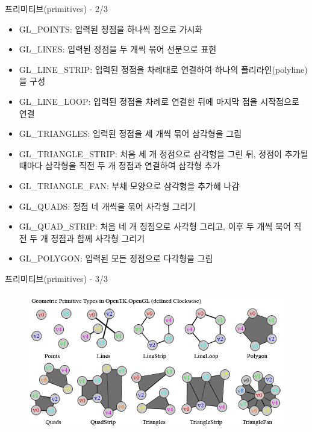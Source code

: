 \documentclass{beamer}
\begin{document}
\begin{frame}[fragile]{프리미티브(primitives) - 2/3}

{\small
\begin{itemize}
\item {\sf GL\_POINTS}: 입력된 정점을 하나씩 점으로 가시화
\item {\sf GL\_LINES}: 입력된 정점을 두 개씩 묶어 선분으로 표현 
\item {\sf GL\_LINE\_STRIP}: 입력된 정점을 차례대로 연결하여 하나의 폴리라인(polyline)을 구성
\item {\sf GL\_LINE\_LOOP}: 입력된 정점을 차례로 연결한 뒤에 마지막 점을 시작점으로 연결
\item {\sf GL\_TRIANGLES}: 입력된 정점을 세 개씩 묶어 삼각형을 그림
\item {\sf GL\_TRIANGLE\_STRIP}: 처음 세 개 정점으로 삼각형을 그린 뒤, 정점이 추가될 때마다 삼각형을 직전 두 개 정점과 연결하여 삼각형 추가 
\item {\sf GL\_TRIANGLE\_FAN}: 부채 모양으로 삼각형을 추가해 나감
\item {\sf GL\_QUADS}: 정점 네 개씩을 묶어 사각형 그리기
\item {\sf GL\_QUAD\_STRIP}: 처음 네 개 정점으로 사각형 그리고, 이후 두 개씩 묵어 직전 두 개 정점과 함께 사각형 그리기
\item {\sf GL\_POLYGON}: 입력된 모든 정점으로 다각형을 그림
\end{itemize}
}


\end{frame}


\begin{frame}[fragile]{프리미티브(primitives) - 3/3}

\begin{figure}
\includegraphics[height=6cm]{OGL_opengl/primitives.png}
\end{figure}


\end{frame}
\end{document}
